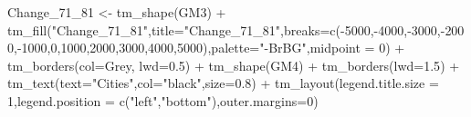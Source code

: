 \documentclass[
]{article}
\newenvironment{Shaded}{\begin{snugshade}}{\end{snugshade}}
\newcommand{\AttributeTok}[1]{\textcolor[rgb]{0.77,0.63,0.00}{#1}}
\newcommand{\DecValTok}[1]{\textcolor[rgb]{0.00,0.00,0.81}{#1}}
\newcommand{\FloatTok}[1]{\textcolor[rgb]{0.00,0.00,0.81}{#1}}
\newcommand{\FunctionTok}[1]{\textcolor[rgb]{0.00,0.00,0.00}{#1}}
\newcommand{\NormalTok}[1]{#1}
\newcommand{\OtherTok}[1]{\textcolor[rgb]{0.56,0.35,0.01}{#1}}
\newcommand{\SpecialCharTok}[1]{\textcolor[rgb]{0.00,0.00,0.00}{#1}}
\newcommand{\StringTok}[1]{\textcolor[rgb]{0.31,0.60,0.02}{#1}}
\begin{document}
\begin{Shaded}
\begin{Highlighting}[]
\NormalTok{Change\_71\_81 }\OtherTok{\textless{}{-}} \FunctionTok{tm\_shape}\NormalTok{(GM3) }\SpecialCharTok{+}
  \FunctionTok{tm\_fill}\NormalTok{(}\StringTok{"Change\_71\_81"}\NormalTok{,}\AttributeTok{title=}\StringTok{"Change\_71\_81"}\NormalTok{,}\AttributeTok{breaks=}\FunctionTok{c}\NormalTok{(}\SpecialCharTok{{-}}\DecValTok{5000}\NormalTok{,}\SpecialCharTok{{-}}\DecValTok{4000}\NormalTok{,}\SpecialCharTok{{-}}\DecValTok{3000}\NormalTok{,}\SpecialCharTok{{-}}\DecValTok{2000}\NormalTok{,}\SpecialCharTok{{-}}\DecValTok{1000}\NormalTok{,}\DecValTok{0}\NormalTok{,}\DecValTok{1000}\NormalTok{,}\DecValTok{2000}\NormalTok{,}\DecValTok{3000}\NormalTok{,}\DecValTok{4000}\NormalTok{,}\DecValTok{5000}\NormalTok{),}\AttributeTok{palette=}\StringTok{"{-}BrBG"}\NormalTok{,}\AttributeTok{midpoint =} \DecValTok{0}\NormalTok{) }\SpecialCharTok{+}
 \FunctionTok{tm\_borders}\NormalTok{(}\AttributeTok{col=}\StringTok{\textquotesingle{}Grey\textquotesingle{}}\NormalTok{, }\AttributeTok{lwd=}\FloatTok{0.5}\NormalTok{) }\SpecialCharTok{+}
\FunctionTok{tm\_shape}\NormalTok{(GM4) }\SpecialCharTok{+}
  \FunctionTok{tm\_borders}\NormalTok{(}\AttributeTok{lwd=}\FloatTok{1.5}\NormalTok{) }\SpecialCharTok{+}
  \FunctionTok{tm\_text}\NormalTok{(}\AttributeTok{text=}\StringTok{"Cities"}\NormalTok{,}\AttributeTok{col=}\StringTok{"black"}\NormalTok{,}\AttributeTok{size=}\FloatTok{0.8}\NormalTok{) }\SpecialCharTok{+}
\FunctionTok{tm\_layout}\NormalTok{(}\AttributeTok{legend.title.size =} \DecValTok{1}\NormalTok{,}\AttributeTok{legend.position =} \FunctionTok{c}\NormalTok{(}\StringTok{"left"}\NormalTok{,}\StringTok{"bottom"}\NormalTok{),}\AttributeTok{outer.margins=}\DecValTok{0}\NormalTok{)}


\end{Highlighting}
\end{Shaded}
\end{document}
